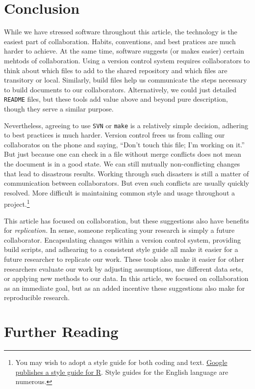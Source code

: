\documentclass[]{article}
\begin{document}
\section{Conclusion}

While we have stressed software throughout this article, the technology is the
easiest part of collaboration. Habits, conventions, and best pratices are much
harder to achieve. At the same time, software suggests (or makes easier)
certain mehtods of collaboration. Using a version control system requires
collaborators to think about which files to add to the shared repository and
which files are transitory or local. Similarly, build files help us
communicate the steps necessary to build documents to our collaborators.
Alternatively, we could just detailed \texttt{README} files, but these tools
add value above and beyond pure description, though they serve a similar
purpose.

Nevertheless, agreeing to use \texttt{SVN} or \texttt{make} is a relatively
simple decision, adhering to best practices is much harder. Version control
frees us from calling our collaboratos on the phone and saying, ``Don't touch
this file; I'm working on it.'' But just because one can check in a file
without merge conflicts does not mean the document is in a good state. We can
still mutually non-conflicting changes that lead to disastrous results.
Working through such disasters is still a matter of communication between
collaborators. But even such conflicts are usually quickly resolved. More
difficult is maintaining common style and usage throughout a
project.\footnote{You may wish to adopt a style guide for both coding and
text.
\href{http://google-styleguide.googlecode.com/svn/trunk/google-r-style.html}
{Google publishes a style guide for
R}.
Style guides for the English language are numerous.}

This article has focused on collaboration, but these suggestions also have
benefits for \emph{replication.} In sense, someone replicating your research
is simply a future collaborator. Encapsulating changes within a version
control system, providing build scripts, and adhearing to a consistent style
guide all make it easier for a future researcher to replicate our work. These
tools also make it easier for other researchers evaluate our work by adjusting 
assumptions, use
different data sets, or applying new methods to our data. In this article, we
focused on collaboration as an immediate goal, but as an added incentive these
suggestions also make for reproducible research. 


\section{Further Reading}

\end{document}
